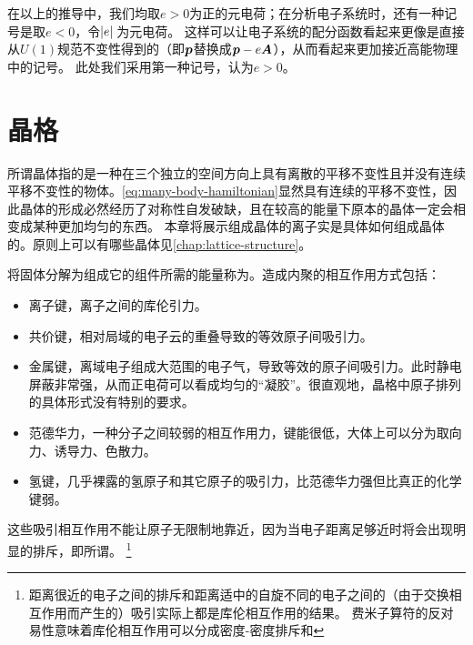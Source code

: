 在以上的推导中，我们均取$e>0$为正的元电荷；在分析电子系统时，还有一种记号是取$e<0$，令$\abs*{e}$为元电荷。
这样可以让电子系统的配分函数看起来更像是直接从$U(1)$规范不变性得到的（即$\vb*{p}$替换成$\vb*{p} - e \vb*{A}$），从而看起来更加接近高能物理中的记号。
此处我们采用第一种记号，认为$e > 0$。

\section{晶格}

所谓晶体指的是一种在三个独立的空间方向上具有离散的平移不变性且并没有连续平移不变性的物体。\eqref{eq:many-body-hamiltonian}显然具有连续的平移不变性，因此晶体的形成必然经历了对称性自发破缺，且在较高的能量下原本的晶体一定会相变成某种更加均匀的东西。
本章将展示组成晶体的离子实是具体如何组成晶体的。原则上可以有哪些晶体见\autoref{chap:lattice-structure}。

将固体分解为组成它的组件所需的能量称为。造成内聚的相互作用方式包括：
\begin{itemize}
    \item 离子键，离子之间的库伦引力。
    \item 共价键，相对局域的电子云的重叠导致的等效原子间吸引力。
    \item 金属键，离域电子组成大范围的电子气，导致等效的原子间吸引力。此时静电屏蔽非常强，从而正电荷可以看成均匀的“凝胶”。很直观地，晶格中原子排列的具体形式没有特别的要求。
    \item 范德华力，一种分子之间较弱的相互作用力，键能很低，大体上可以分为取向力、诱导力、色散力。
    \item 氢键，几乎裸露的氢原子和其它原子的吸引力，比范德华力强但比真正的化学键弱。
\end{itemize}
这些吸引相互作用不能让原子无限制地靠近，因为当电子距离足够近时将会出现明显的排斥，即所谓。%
\footnote{
    距离很近的电子之间的排斥和距离适中的自旋不同的电子之间的（由于交换相互作用而产生的）吸引实际上都是库伦相互作用的结果。
    费米子算符的反对易性意味着库伦相互作用可以分成密度-密度排斥和 %
}%

